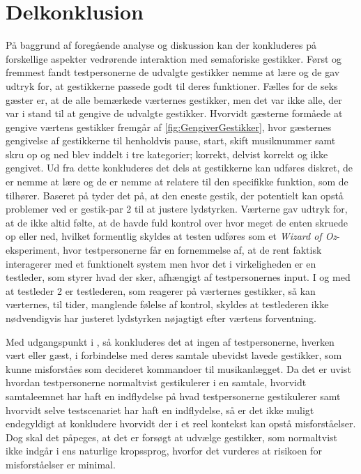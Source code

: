 \section{Delkonklusion}
\label{SocialAcceptDelkonklusion}
%
På baggrund af foregående analyse og diskussion kan der konkluderes på forskellige aspekter vedrørende interaktion med semaforiske gestikker. Først og fremmest fandt testpersonerne de udvalgte gestikker nemme at lære og de gav udtryk for, at gestikkerne passede godt til deres funktioner. Fælles for de seks gæster er, at de alle bemærkede værternes gestikker, men det var ikke alle, der var i stand til at gengive de udvalgte gestikker. Hvorvidt gæsterne formåede at gengive værtens gestikker fremgår af \autoref{fig:GengiverGestikker}, hvor gæsternes gengivelse af gestikkerne til henholdvis pause, start, skift musiknummer samt skru op og ned blev inddelt i tre kategorier; korrekt, delvist korrekt og ikke gengivet. Ud fra dette konkluderes det dels at gestikkerne kan udføres diskret, de er nemme at lære og de er nemme at relatere til den specifikke funktion, som de tilhører. Baseret på  tyder det på, at den eneste gestik, der potentielt kan opstå problemer ved er gestik-par 2 til at justere lydstyrken. Værterne gav udtryk for, at de ikke altid følte, at de havde fuld kontrol over hvor meget de enten skruede op eller ned, hvilket formentlig skyldes at testen udføres som et \textit{Wizard of Oz}-eksperiment, hvor testpersonerne får en fornemmelse af, at de rent faktisk interagerer med et funktionelt system men hvor det i virkeligheden er en testleder, som styrer hvad der sker, afhængigt af testpersonernes input. I og med at testleder 2 er testlederen, som reagerer på værternes gestikker, så kan værternes, til tider, manglende følelse af kontrol, skyldes at testlederen ikke nødvendigvis har justeret lydstyrken nøjagtigt efter værtens forventning.    

Med udgangspunkt i , så konkluderes det at ingen af testpersonerne, hverken vært eller gæst, i forbindelse med deres samtale ubevidst lavede gestikker, som kunne misforståes som decideret kommandoer til musikanlægget. Da det er uvist hvordan testpersonerne normaltvist gestikulerer i en samtale, hvorvidt  samtaleemnet har haft en indflydelse på hvad testpersonerne gestikulerer samt hvorvidt selve testscenariet har haft en indflydelse, så er det ikke muligt endegyldigt at konkludere hvorvidt der i et reel kontekst kan opstå misforståelser. Dog skal det påpeges, at det er forsøgt at udvælge gestikker, som normaltvist ikke indgår i ens naturlige kropssprog, hvorfor det vurderes at risikoen for misforståelser er minimal.   

